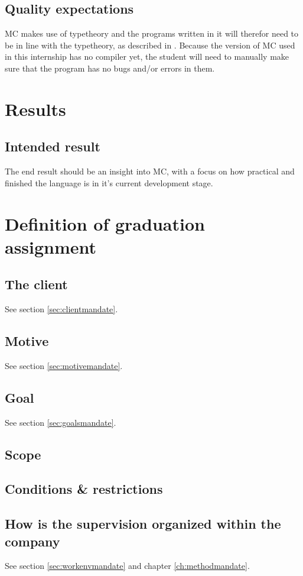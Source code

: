 \section{Quality expectations}
MC makes use of typetheory and the programs written in it will therefor need to be in line with the typetheory, as described in \cite{pierce2002types}.
Because the version of MC used in this internship has no compiler yet, the student will need to manually make sure that the program has no bugs and/or errors in them.

\chapter{Results}
\section{Intended result}
The end result should be an insight into MC, with a focus on how practical and finished the language is in it's current development stage.

\chapter{Definition of graduation assignment}
\section{The client}
See section \ref{sec:clientmandate}.

\section{Motive}
See section \ref{sec:motivemandate}.

\section{Goal}
See section \ref{sec:goalsmandate}.

\section{Scope}

\section{Conditions \& restrictions}

\section{How is the supervision organized within the company}
See section \ref{sec:workenvmandate} and chapter \ref{ch:methodmandate}.

